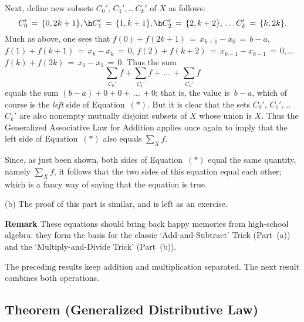        Next, define new subsets $C_{0}'$, $C_{1}'$,\,{\ldots}\,$C_{k}'$ of $X$ as follows:
        \begin{displaymath}
        C_{0}' \,=\, \{0,2k+1\}, \h C_{1}' \,=\, \{1,k+1\}, \h C_{2}' \,=\, \{2,k+2\},\,{\ldots}\,C_{k}' \,=\, \{k,2k\}.
        \end{displaymath}
    Much as above, one sees that $f(0)+f(2k+1) \,=\, x_{k+1} - x_{0} \,=\, b-a$, $f(1)+f(k+1) \,=\, x_{k}-x_{k} \,=\, 0$, $f(2)+f(k+2) \,=\, x_{k-1}-x_{k-1} \,=\, 0$,\,{\ldots}\,$f(k)+f(2k) \,=\, x_{1}-x_{1} \,=\, 0$.
    Thus the sum
        \begin{displaymath}
        {\sum}_{C_{0}'} f + {\sum}_{C_{1}'} f + \,{\ldots}\,+{\sum}_{C_{k}'} f 
        \end{displaymath}
    equals the sum $(b-a) + 0 + 0 + \,{\ldots}\,+ 0$; that is, the value is~$b-a$, which of course is the {\em left} side of  Equation~$({\ast})$.
    But it is clear that the sets $C_{0}'$, $C_{1}'$,\,{\ldots}\, $C_{k}'$ are also nonempty mutually disjoint subsets of $X$ whose union is $X$.
    Thus the Generalized Associative Law for Addition applies once again to imply that the left side of Equation~$({\ast})$ also equals ${\sum}_{X} f$.


        Since, as just been shown, both sides of Equation~$({\ast})$ equal the same quantity, namely ${\sum}_{X} f$,
    it follows that the two sides of this equation equal each other; which is a fancy way of saying that the equation is true.

\V

        (b) The proof of this part is similar, and is left as an exercise.


\V
\V

        {\bf Remark} These equations should bring back happy memories from high-school algebra:
    they form the basis for the classic `Add-and-Subtract' Trick (Part~(a)) and the `Multiply-and-Divide Trick' (Part~(b)).

\V
\V


        The preceding results keep addition and multiplication separated. The next result combines both operations.

\V

            \subsection{\small{\bf Theorem} (Generalized Distributive Law)}
            \label{ThmB10.110}

\V

